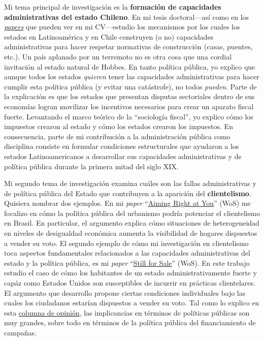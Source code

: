 \documentclass[12pt,stdletter,dateno,sigleft]{newlfm} %
\begin{document}
\begin{newlfm}
Mi tema principal de investigaci\'on es la {\bf formaci\'on de capacidades administrativas del estado Chileno}. En mi tesis doctoral---as\'i como en los \href{https://github.com/hbahamonde/Earthquake_Paper/raw/master/Bahamonde_Earthquake_Paper.pdf}{\emph{papers}} que pueden ver en mi CV---estudio los mecanismos por los cuales los estados en Latinoam\'erica y en Chile construyen (o no) capacidades administrativas para hacer respetar normativas de construcci\'on (casas, puentes, etc.). Un pa\'is aplanado por un terremoto no es otra cosa que una cordial invitaci\'on al estado natural de Hobbes. En tanto pol\'itica p\'ublica, yo explico que aunque todos los estados \emph{quieren} tener las capacidades administrativas para hacer cumplir esta pol\'itica p\'ublica (y evitar una cat\'astrofe), no todos \emph{pueden}. Parte de la explicaci\'on es que los estados que presentan disputas sectoriales dentro de sus econom\'ias logran movilizar los incentivos necesarios para crear un aparato fiscal fuerte. Levantando el marco te\'orico de la ``sociolog\'ia fiscal'', yo explico c\'omo los impuestos crearon al estado y c\'omo los estados crearon los impuestos. En consecuencia, parte de mi contribuci\'on a la administraci\'on p\'ublica como disciplina consiste en formular condiciones estructurales que ayudaron a los estados Latinoamericanos a desarrollar sus capacidades administrativas y de pol\'itica p\'ublica durante la primera mitad del siglo XIX. 


Mi segundo tema de investigaci\'on examina cu\'ales son las fallas administrativas y de pol\'itica p\'ublica del Estado que contribuyen a la aparici\'on del {\bf clientelismo}. Quisiera nombrar dos ejemplos. En mi \emph{paper} ``\href{https://journals.sub.uni-hamburg.de/giga/jpla/article/view/1121/1128}{Aiming Right at You}'' (WoS) me focalizo en c\'omo la pol\'itica p\'ublica del urbanismo podr\'ia potenciar el clientelismo en Brasil. En particular, el argumento explica c\'omo situaciones de heterogeneidad en niveles de desigualdad econ\'omica aumenta la visibilidad de hogares dispuestos a vender su voto. El segundo ejemplo de c\'omo mi investigaci\'on en clientelismo toca aspectos fundamentales relacionados a las capacidades administrativas del estado y la pol\'itica p\'ublica, es mi \emph{paper} ``\href{https://doi.org/10.1057/s41269-020-00174-4}{Still for Sale}'' (WoS). En este trabajo estudio el caso de c\'omo los habitantes de un estado administrativamente fuerte y cap\'az como Estados Unidos son susceptibles de incurrir en pr\'acticas clientelares. El argumento que desarrollo propone ciertas condiciones individuales bajo las cuales los ciudadanos estar\'ian dispuestos a vender su voto. Tal como lo explico en esta \href{https://eltipografo.cl/2019/07/desigualdad-y-democracia-en-chile}{columna de opini\'on}, las implicancias en t\'erminos de pol\'iticas p\'ublicas son muy grandes, sobre todo en t\'erminos de la pol\'itica p\'ublica del financiamiento de campa\~nas.




\end{newlfm}
\end{document}
